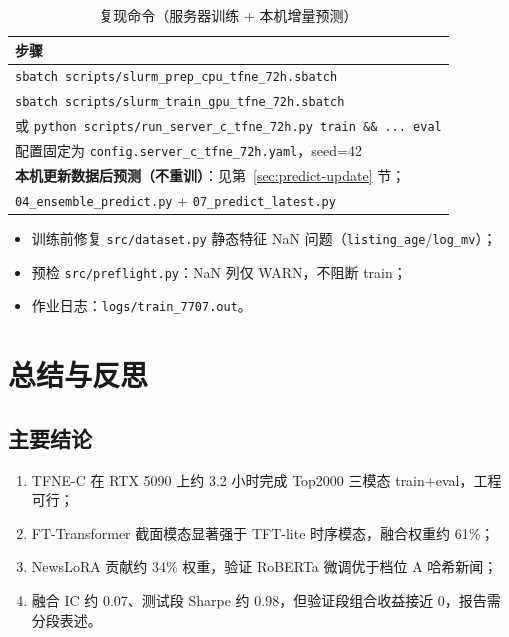\documentclass[UTF8,a4paper,12pt]{ctexart}
\begin{document}
\begin{table}[H]
\centering
\caption{复现命令（服务器训练 + 本机增量预测）}
\label{tab:repro}
\begin{tabular}{p{11cm}}
\toprule
\textbf{步骤} \\
\midrule
\texttt{sbatch scripts/slurm\_prep\_cpu\_tfne\_72h.sbatch} \\
\texttt{sbatch scripts/slurm\_train\_gpu\_tfne\_72h.sbatch} \\
或 \texttt{python scripts/run\_server\_c\_tfne\_72h.py train \&\& ... eval} \\
配置固定为 \texttt{config.server\_c\_tfne\_72h.yaml}，seed=42 \\
\midrule
\textbf{本机更新数据后预测（不重训）}：见第~\ref{sec:predict-update} 节；\\
\texttt{04\_ensemble\_predict.py} + \texttt{07\_predict\_latest.py} \\
\bottomrule
\end{tabular}
\end{table}

\begin{itemize}[leftmargin=2em]
  \item 训练前修复 \texttt{src/dataset.py} 静态特征 NaN 问题（\texttt{listing\_age}/\texttt{log\_mv}）；
  \item 预检 \texttt{src/preflight.py}：NaN 列仅 WARN，不阻断 train；
  \item 作业日志：\texttt{logs/train\_7707.out}。
\end{itemize}

\section{总结与反思}

\subsection{主要结论}

\begin{enumerate}[leftmargin=2em]
  \item TFNE-C 在 RTX 5090 上约 3.2 小时完成 Top2000 三模态 train+eval，工程可行；
  \item FT-Transformer 截面模态显著强于 TFT-lite 时序模态，融合权重约 61\%；
  \item NewsLoRA 贡献约 34\% 权重，验证 RoBERTa 微调优于档位 A 哈希新闻；
  \item 融合 IC 约 0.07、测试段 Sharpe 约 0.98，但验证段组合收益接近 0，报告需分段表述。
\end{enumerate}
\end{document}

